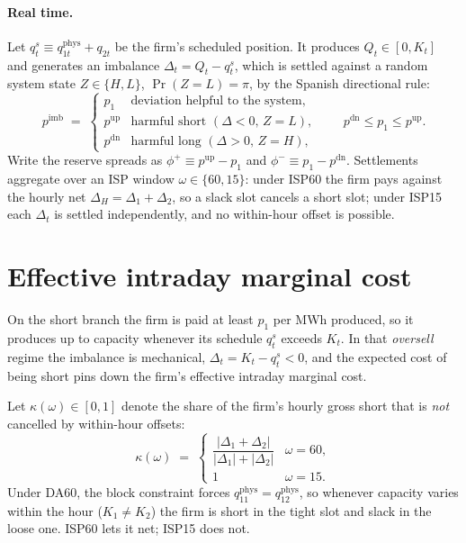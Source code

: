 \documentclass[11pt,a4paper]{article}
\begin{document}
\paragraph{Real time.} Let $q^s_t \equiv q_{1t}^{\mathrm{phys}} + q_{2t}$
be the firm's scheduled position. It produces $Q_t \in [0,K_t]$ and
generates an imbalance $\Delta_t = Q_t - q^s_t$, which is settled against
a random system state $Z\in\{H,L\}$, $\Pr(Z=L)=\pi$, by the Spanish
directional rule:
\[
p^{\mathrm{imb}} \;=\; \begin{cases}
p_1 & \text{deviation helpful to the system,} \\
p^{\mathrm{up}} & \text{harmful short } (\Delta<0,\,Z=L), \\
p^{\mathrm{dn}} & \text{harmful long } (\Delta>0,\,Z=H),
\end{cases}
\qquad p^{\mathrm{dn}} \leq p_1 \leq p^{\mathrm{up}}.
\]
Write the reserve spreads as
$\phi^+ \equiv p^{\mathrm{up}}-p_1$ and
$\phi^- \equiv p_1 - p^{\mathrm{dn}}$. Settlements aggregate over an ISP
window $\omega \in \{60,15\}$: under ISP60 the firm pays against the
hourly net $\Delta_H = \Delta_1 + \Delta_2$, so a slack slot cancels a
short slot; under ISP15 each $\Delta_t$ is settled independently, and no
within-hour offset is possible.

\section{Effective intraday marginal cost}

On the short branch the firm is paid at least $p_1$ per MWh produced, so
it produces up to capacity whenever its schedule $q^s_t$ exceeds $K_t$.
In that \emph{oversell} regime the imbalance is mechanical,
$\Delta_t = K_t - q^s_t < 0$, and the expected cost of being short pins
down the firm's effective intraday marginal cost.

Let $\kappa(\omega)\in[0,1]$ denote the share of the firm's hourly gross
short that is \emph{not} cancelled by within-hour offsets:
\begin{equation}
\kappa(\omega) \;=\;
\begin{cases}
\dfrac{|\Delta_1+\Delta_2|}{|\Delta_1|+|\Delta_2|} & \omega = 60, \\[8pt]
1 & \omega = 15.
\end{cases}
\label{eq:kappa}
\end{equation}
Under DA60, the block constraint forces $q_{11}^{\mathrm{phys}} =
q_{12}^{\mathrm{phys}}$, so whenever capacity varies within the hour
($K_1 \neq K_2$) the firm is short in the tight slot and slack in the
loose one. ISP60 lets it net; ISP15 does not.
\end{document}
